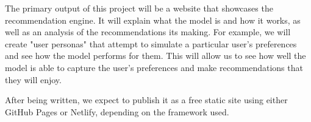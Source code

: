 \documentclass{common/ucsdreport}
\begin{document}
The primary output of this project will be a website that showcases the recommendation engine. It will explain what the model is and how it works, as well as an analysis of the recommendations its making. For example, we will create "user personas" that attempt to simulate a particular user's preferences and see how the model performs for them. This will allow us to see how well the model is able to capture the user's preferences and make recommendations that they will enjoy.

After being written, we expect to publish it as a free static site using either GitHub Pages or Netlify, depending on the framework used.




\end{document}
